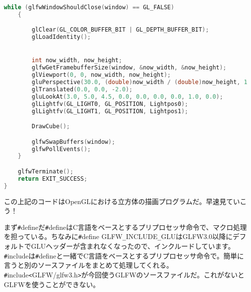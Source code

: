 \documentclass[12pt,a4paper,titlepage]{jsarticle}
\begin{document}
\begin{lstlisting}[language=C++]
	while (glfwWindowShouldClose(window) == GL_FALSE)
	{

		glClear(GL_COLOR_BUFFER_BIT | GL_DEPTH_BUFFER_BIT);
		glLoadIdentity();


		int now_width, now_height;
		glfwGetFramebufferSize(window, &now_width, &now_height);
		glViewport(0, 0, now_width, now_height);
		gluPerspective(30.0, (double)now_width / (double)now_height, 1.0, 100.0);
		glTranslated(0.0, 0.0, -2.0);
		gluLookAt(3.0, 5.0, 4.5, 0.0, 0.0, 0.0, 0.0, 1.0, 0.0);
		glLightfv(GL_LIGHT0, GL_POSITION, Lightpos0);
		glLightfv(GL_LIGHT1, GL_POSITION, Lightpos1);

		DrawCube();

		glfwSwapBuffers(window);
		glfwPollEvents();
	}

	glfwTerminate();
	return EXIT_SUCCESS;
}
\end{lstlisting}

この上記のコードはOpenGLにおける立方体の描画プログラムだ。早速見ていこう！

まず\verb|#|defineだ\verb|#|defineはC言語をベースとするプリプロセッサ命令で、マクロ処理を担っている。ちなみに\verb|#|define GLFW\verb|_|INCLUDE\verb|_|GLUはGLFW3.0以降にデフォルトでGLUヘッダーが含まれなくなったので、インクルードしています。
\verb|#|includeは\verb|#|defineと一緒でC言語をベースとするプリプロセッサ命令で。簡単に言うと別のソースファイルをまとめて処理してくれる。
\verb|#|include\verb|<|GLFW/glfw3.h\verb|>|が今回使うGLFWのソースファイルだ。これがないとGLFWを使うことができない。
\end{document}
